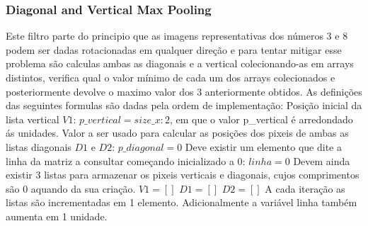 \subsubsection{Diagonal and Vertical Max Pooling}\hfill\newline
  \hfill\newline
  Este filtro parte do principio que as imagens representativas dos números 3 e 8 podem ser dadas rotacionadas em qualquer direção e para tentar mitigar esse problema são calculas ambas as diagonais e a vertical colecionando-as em arrays distintos, verifica qual o valor mínimo de cada um dos arrays colecionados e posteriormente devolve o maximo valor dos 3 anteriormente obtidos. As definições das seguintes formulas são dadas pela ordem de implementação:\hfill\newline 
  \hfill\newline
  Posição inicial da lista vertical $V1 $:\hfill\newline
  \hfill\newline
  $p\_vertical = size\_x : 2$, em que o valor p\_vertical é arredondado ás unidades.\hfill\newline
  \hfill\newline
  Valor a ser usado para calcular as posições dos pixeis de ambas as listas diagonais $D1$ e $D2$:\hfill\newline
  \hfill\newline
  $p\_diagonal = 0$\hfill\newline
  \hfill\newline
  Deve existir um elemento que dite a linha da matriz a consultar começando inicializado a 0:\hfill\newline
  \hfill\newline
  $linha = 0$\hfill\newline
  \hfill\newline
  Devem ainda existir 3 listas para armazenar os pixeis verticais e diagonais, cujos comprimentos são 0 aquando da sua criação.\hfill\newline
  \hfill\newline
  $V1 = []$\hfill\newline
  $D1 = []$\hfill\newline
  $D2 = []$\hfill\newline
  \hfill\newline
  A cada iteração as listas são incrementadas em 1 elemento. Adicionalmente a variável linha também aumenta em 1 unidade.\hfill\newline
  \hfill\newline
